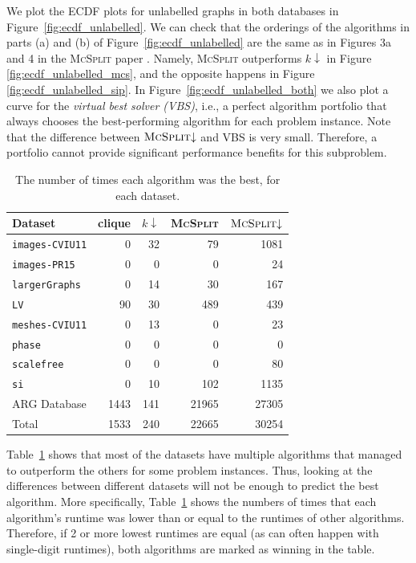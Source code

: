 \documentclass{l4proj}
\theoremstyle{definition}
\theoremstyle{remark}
\begin{document}
We plot the ECDF plots for unlabelled graphs in both databases in
Figure~\ref{fig:ecdf_unlabelled}. We can check that the orderings of the
algorithms in parts (a) and (b) of Figure~\ref{fig:ecdf_unlabelled} are the same
as in Figures 3a and 4 in the \textsc{McSplit} paper
\cite{DBLP:conf/ijcai/McCreeshPT17}. Namely, \textsc{McSplit} outperforms
$k{\downarrow}$ in Figure \ref{fig:ecdf_unlabelled_mcs}, and the opposite
happens in Figure \ref{fig:ecdf_unlabelled_sip}. In
Figure~\ref{fig:ecdf_unlabelled_both} we also plot a curve for the \emph{virtual
  best solver (VBS)}, i.e., a perfect algorithm portfolio that always chooses
the best-performing algorithm for each problem instance. Note that the
difference between $\textsc{McSplit}{\downarrow}$ and VBS is very small.
Therefore, a portfolio cannot provide significant performance benefits for this
subproblem.

\begin{table}
  \centering
  \begin{tabular}{l r r r r}
    Dataset & clique & $k{\downarrow}$ & \textsc{McSplit} & $\textsc{McSplit}{\downarrow}$ \\
    \hline
    \texttt{images-CVIU11} & 0 & 32 & 79 & 1081 \\
    \texttt{images-PR15} & 0 & 0 & 0 & 24 \\
    \texttt{largerGraphs} & 0 & 14 & 30 & 167 \\
    \texttt{LV} & 90 & 30 & 489 & 439 \\
    \texttt{meshes-CVIU11} & 0 & 13 & 0 & 23 \\
    \texttt{phase} & 0 & 0 & 0 & 0 \\
    \texttt{scalefree} & 0 & 0 & 0 & 80 \\
    \texttt{si} & 0 & 10 & 102 & 1135 \\
    ARG Database & 1443 & 141 & 21965 & 27305 \\
    \hline
    Total & 1533 & 240 & 22665 & 30254
  \end{tabular}
  \caption{The number of times each algorithm was the best, for each dataset.}
  \label{table:best}
\end{table}

Table~\ref{table:best} shows that most of the datasets have multiple algorithms
that managed to outperform the others for some problem instances. Thus, looking
at the differences between different datasets will not be enough to predict the
best algorithm. More specifically, Table~\ref{table:best} shows the numbers of
times that each algorithm's runtime was lower than or equal to the runtimes of
other algorithms. Therefore, if 2 or more lowest runtimes are equal (as can
often happen with single-digit runtimes), both algorithms are marked as winning
in the table.
\end{document}
